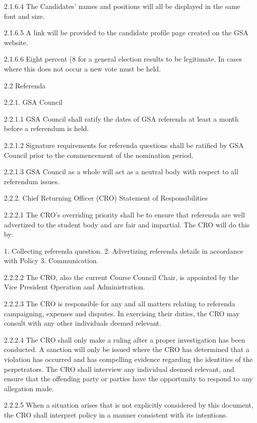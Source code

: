  2.1.6.4 The Candidates’ names and positions will all be displayed in the 
 same font and size. 
 
 2.1.6.5 A link will be provided to the candidate profile page created on 
 the GSA website. 
 
 2.1.6.6 Eight percent (8%
 for a general election results to be legitimate. In cases where this 
 does not occur a new vote must be held. 
 
 
 2.2 Referenda 
 
 2.2.1. GSA Council 
 
 2.2.1.1 GSA Council shall ratify the dates of GSA referenda at least a 
 month before a referendum is held. 
 
 2.2.1.2 Signature requirements for referenda questions shall be ratified by 
 GSA Council prior to the commencement of the nomination 
 period. 
 
 2.2.1.3 GSA Council as a whole will act as a neutral body with respect to 
 all referendum issues. 
 
 2.2.2. Chief Returning Officer (CRO) Statement of Responsibilities 
 
 2.2.2.1 The CRO’s overriding priority shall be to ensure that referenda 
 are well advertized to the student body and are fair and impartial. 
 The CRO will do this by: 
 
 1. Collecting referenda question. 
 2. Advertizing referenda details in accordance with Policy 3. 
 Communication. 
 
 2.2.2.2 The CRO, also the current Course Council Chair, is appointed by 
 the Vice President Operation and Administration. 
 
 2.2.2.3 The CRO is responsible for any and all matters relating to referenda campaigning, expenses and disputes. In exercising their 
 duties, the CRO may consult with any other individuals deemed 
 relevant. 
 
 2.2.2.4 The CRO shall only make a ruling after a proper investigation has 
 been conducted. A sanction will only be issued where the CRO 
 has determined that a violation has occurred and has compelling 
 evidence regarding the identities of the perpetrators. The CRO 
 shall interview any individual deemed relevant, and ensure that 
 the offending party or parties have the opportunity to respond to 
 any allegation made. 
 
 2.2.2.5 When a situation arises that is not explicitly considered by this 
 document, the CRO shall interpret policy in a manner consistent 
 with its intentions. 
  
